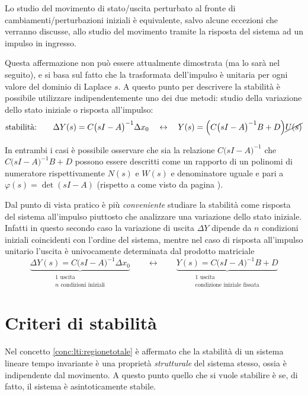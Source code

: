 		\begin{concetto}
			Lo studio del movimento di stato/uscita perturbato al fronte di cambiamenti/perturbazioni iniziali è equivalente, salvo alcune eccezioni che verranno discusse, allo studio del movimento tramite la risposta del sistema ad un impulso in ingresso.
		\end{concetto}
		Questa affermazione non può essere attualmente dimostrata (ma lo sarà nel seguito), e si basa sul fatto che la trasformata dell'impulso è unitaria per ogni valore del dominio di Laplace $s$. A questo punto per descrivere la stabilità è possibile utilizzare indipendentemente uno dei due metodi: studio della variazione dello stato iniziale o risposta all'impulso:
		\[\textrm{stabilità:} \qquad \Delta Y(s) = C\big(sI-A\big)^{-1} \Delta x_0 \quad \leftrightarrow \quad Y(s) = \Big(C\big(sI-A\big)^{-1}B + D\Big)\cancel{U(s)}\]
		
		In entrambi i casi è possibile osservare che sia la relazione $C\big(sI-A\big)^{-1}$ che $C\big(sI-A\big)^{-1}B + D$ possono essere descritti come un rapporto di un polinomi di numeratore rispettivamente $N(s)$ e $W(s)$ e denominatore uguale e pari a $\varphi(s) = \det(sI-A)$ (rispetto a come visto da pagina \pageref{sec:lti:studiomovimenti}).
		
		Dal punto di vista pratico è più \textit{conveniente} studiare la stabilità come risposta del sistema all'impulso piuttosto che analizzare una variazione dello stato iniziale. Infatti in questo secondo caso la variazione di uscita $\Delta Y$ dipende da $n$ condizioni iniziali coincidenti con l'ordine del sistema, mentre nel caso di risposta all'impulso unitario l'uscita è univocamente determinata dal prodotto matriciale
		\[ \underbrace{\Delta Y(s) = C\big(sI-A\big)^{-1} \Delta x_0}_{\substack{\textrm{1 uscita} \\ \textrm{$n$ condizioni iniziali} }} \qquad \leftrightarrow \qquad \underbrace{Y(s) = C\big(sI-A\big)^{-1}B + D}_{\substack{\textrm{1 uscita} \\ \textrm{condizione iniziale fissata} }}\]

\section{Criteri di stabilità}
	Nel concetto \ref{conc:lti:regionetotale} è affermato che la stabilità di un sistema lineare tempo invariante è una proprietà \textit{strutturale} del sistema stesso, ossia è indipendente dal movimento. A questo punto quello che si vuole stabilire è se, di fatto, il sistema è asintoticamente stabile.
	
